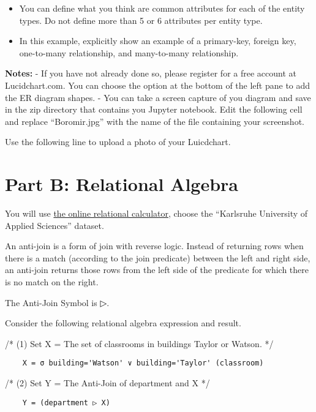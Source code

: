 \documentclass[11pt]{article}
\begin{document}
\begin{itemize}
\item
  You can define what you think are common attributes for each of the
  entity types. Do not define more than 5 or 6 attributes per entity
  type.
\item
  In this example, explicitly show an example of a primary-key, foreign
  key, one-to-many relationship, and many-to-many relationship.
\end{itemize}

\textbf{Notes:} - If you have not already done so, please register for a
free account at Lucidchart.com. You can choose the option at the bottom
of the left pane to add the ER diagram shapes. - You can take a screen
capture of you diagram and save in the zip directory that contains you
Jupyter notebook. Edit the following cell and replace ``Boromir.jpg''
with the name of the file containing your screenshot.

    Use the following line to upload a photo of your Luicdchart.

    \hypertarget{part-b-relational-algebra}{%
\section{Part B: Relational Algebra}\label{part-b-relational-algebra}}

    You will use \href{https://dbis-uibk.github.io/relax/landing}{the online
relational calculator}, choose the ``Karlsruhe University of Applied
Sciences'' dataset.

An anti-join is a form of join with reverse logic. Instead of returning
rows when there is a match (according to the join predicate) between the
left and right side, an anti-join returns those rows from the left side
of the predicate for which there is no match on the right.

The Anti-Join Symbol is ▷.

    Consider the following relational algebra expression and result.

/* (1) Set X = The set of classrooms in buildings Taylor or Watson. */

\begin{verbatim}
    X = σ building='Watson' ∨ building='Taylor' (classroom)
\end{verbatim}

/* (2) Set Y = The Anti-Join of department and X */

\begin{verbatim}
    Y = (department ▷ X)
\end{verbatim}
\end{document}
